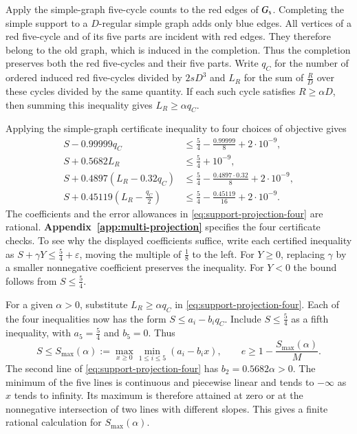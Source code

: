 Apply the simple-graph five-cycle counts to the red edges of
$G_{\rm s}$. Completing the simple support to a $D$-regular simple
graph adds only blue edges. All vertices of a red five-cycle and of
its five parts are incident with red edges. They therefore belong
to the old graph, which is induced in the completion. Thus the
completion preserves both the red five-cycles and their five
parts. Write $q_C$ for the number of ordered induced red five-cycles
divided by $2sD^3$ and $L_R$ for the sum of $\frac RD$ over these
cycles divided by the same quantity. If each such cycle satisfies
$R\geq\alpha D$, then summing this inequality gives $L_R\geq\alpha q_C$.

Applying the simple-graph certificate inequality to four choices
of objective gives
\begin{equation}\label{eq:support-projection-four}
\begin{aligned}
 S-0.99999q_C
   &\le \frac{5}{4}-\frac{0.99999}{8}+2\cdot10^{-9},\\
 S+0.5682L_R
   &\le \frac{5}{4}+10^{-9},\\
 S+0.4897(L_R-0.32q_C)
   &\le \frac{5}{4}-\frac{0.4897\cdot0.32}{8}+2\cdot10^{-9},\\
 S+0.45119\left(L_R-\frac{q_C}{2}\right)
   &\le \frac{5}{4}-\frac{0.45119}{16}+2\cdot10^{-9}.
\end{aligned}
\end{equation}
The coefficients and the error allowances in
\eqref{eq:support-projection-four} are rational.
\textbf{Appendix~\ref{app:multi-projection}} specifies the
four certificate checks. To see why the displayed coefficients
suffice, write each certified inequality as $S+\gamma Y\leq
\frac54+\varepsilon$, moving the multiple of $\frac18$ to the left.
For $Y\geq0$, replacing $\gamma$ by a smaller nonnegative coefficient
preserves the inequality. For $Y<0$ the bound follows from
$S\leq\frac54$.

For a given $\alpha>0$, substitute $L_R\geq\alpha q_C$ in
\eqref{eq:support-projection-four}. Each of the four inequalities
now has the form $S\leq a_i-b_iq_C$. Include $S\leq\frac54$ as
a fifth inequality, with $a_5=\frac54$ and $b_5=0$. Thus
\[
 S\leq S_{\max}(\alpha):=
 \max_{x\geq0}\min_{1\leq i\leq5}(a_i-b_ix),
 \qquad e\geq1-\frac{S_{\max}(\alpha)}{M}.
\]
The second line of \eqref{eq:support-projection-four} has
$b_2=0.5682\alpha>0$. The minimum of the five lines is continuous
and piecewise linear and tends to $-\infty$ as $x$ tends to infinity.
Its maximum is therefore attained at zero or at the nonnegative
intersection of two lines with different slopes. This gives a finite
rational calculation for $S_{\max}(\alpha)$.

